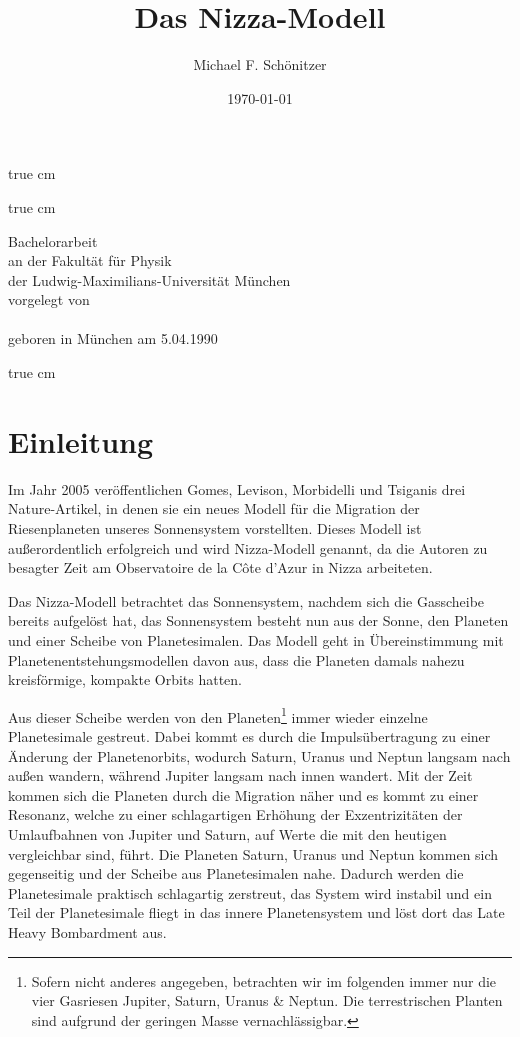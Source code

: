 \documentclass[12pt,a4paper,twoside]{article}
\author{Michael F. Schönitzer}
\title{Das Nizza-Modell}
\date{\today}
\renewcommand{\cite}{\citep}
\begin{document}
\begin{titlepage}
\setcounter{page}{0}
\thispagestyle{empty}
 true cm
\centerline{\huge \thetitle}
\bigskip\bigskip 
{} true cm

\begin{centering}\large
Bachelorarbeit\\
an der Fakultät für Physik\\
der Ludwig-Maximilians-Universität München
\\[1cm]
vorgelegt von\\
\theauthor\\
geboren in München am 5.04.1990\\
\end{centering}
 true cm
\centerline{\theauthor}
\centerline{\thedate}
\end{titlepage}

\clearpage
\tableofcontents
\clearpage

\section{Einleitung}
Im Jahr 2005 veröffentlichen Gomes, Levison, Morbidelli und Tsiganis drei Nature-Artikel\cite{Tsiganis2005,Morbidelli2005,Gomes2005},
in denen sie ein neues Modell für die Migration der Riesenplaneten unseres Sonnensystem vorstellten. Dieses Modell ist außerordentlich erfolgreich und wird Nizza-Modell genannt, da die Autoren zu besagter Zeit am Observatoire de la Côte d’Azur in Nizza arbeiteten.

Das Nizza-Modell betrachtet das Sonnensystem, nachdem sich die Gasscheibe bereits aufgelöst hat, das Sonnensystem besteht nun aus der Sonne, den Planeten und einer Scheibe von Planetesimalen. Das Modell geht in Übereinstimmung mit Planetenentstehungsmodellen davon aus, dass die Planeten damals nahezu kreisförmige, kompakte Orbits hatten.

Aus dieser Scheibe werden von den Planeten\footnote{Sofern nicht anderes angegeben, betrachten wir im folgenden immer nur die vier Gasriesen Jupiter, Saturn, Uranus \& Neptun. Die terrestrischen Planten sind aufgrund der geringen Masse vernachlässigbar.} immer wieder einzelne Planetesimale gestreut.
Dabei kommt es durch die Impulsübertragung zu einer Änderung der Planeten\-orbits\cite{Tsiganis2005},
wodurch Saturn, Uranus und Neptun langsam nach außen wandern, während Jupiter langsam nach innen wandert\cite{Hahn1999,Tsiganis2005}.
Mit der Zeit kommen sich die Planeten durch die Migration näher und es kommt zu einer Resonanz,
welche zu einer schlagartigen Erhöhung der Exzentrizitäten der Umlaufbahnen von Jupiter und Saturn, auf Werte die mit den heutigen vergleichbar sind, führt.
Die Planeten Saturn, Uranus und Neptun kommen sich gegenseitig und der Scheibe aus Planetesimalen nahe. Dadurch werden die Planetesimale praktisch schlagartig zerstreut, das System wird instabil und ein Teil der Planetesimale fliegt in das innere Planetensystem und löst dort das Late Heavy Bombardment aus.
\end{document}
